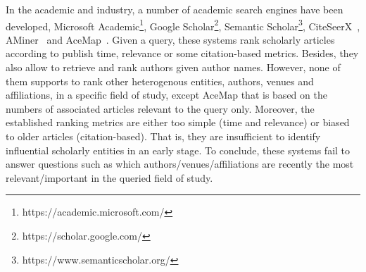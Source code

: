 In the academic and industry, a number of academic search engines have been developed, \eg Microsoft Academic\footnote{https://academic.microsoft.com/}, Google Scholar\footnote{https://scholar.google.com/}, Semantic Scholar\footnote{https://www.semanticscholar.org/}, CiteSeerX~\cite{li2006citeseerx}, AMiner~\cite{tang2008arnetminer} and AceMap~\cite{tan2016acemap}.
%
Given a query, these systems rank scholarly articles according to publish time, relevance or some citation-based metrics. %
%
Besides, they also allow to retrieve and rank authors given author names.
%
However, none of them supports to rank other heterogenous entities, \eg authors, venues and affiliations, in a specific field of study, except AceMap that is based on the numbers of associated articles relevant to the query only. Moreover, the established ranking metrics are either too simple (\eg time and relevance) or biased to older articles (\eg citation-based). That is, they are insufficient to identify influential scholarly entities in an early stage.
%
To conclude, these systems fail to answer questions such as which authors/venues/affiliations are recently the most relevant/important in the queried field of study.




